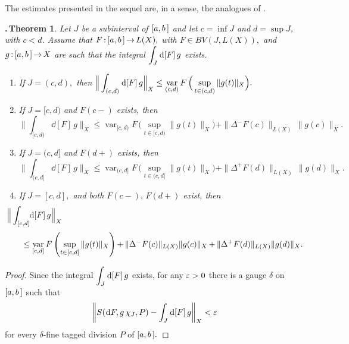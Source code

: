 \documentclass[12pt,twoside]{article}
\numberwithin{equation}{section}
\theoremstyle{plain}
\newtheorem{theorem}{\hskip-1mm.\,Theorem}[section]
\theoremstyle{definition}
\DeclareMathOperator{\var}{var}
\begin{document}
{\smallskip

The estimates presented in the sequel are, in a sense, the analogues of \cite[Proposition 10]{Sch1}.

\begin{theorem}\label{int-inequality}
Let $J$ be a subinterval of $[a,b\,]$ and let $c=\inf J$ and $d=\sup J$, with $c<d$.
Assume that $F\,{:}\,[a,b\,]\,{\to}\,L(X),$ with $F\in BV(J,L(X)),$ and
$g\,{:}\,[a,b\,]\,{\to}\,X$ are such that the integral $\displaystyle\int_{J}\hskip0.2mm\mbox{\rm d}[F]\,g$
exists.
\begin{enumerate}[{\rm (i)}]
\item If $J=(c,d),$ then
$\dis\Big\|\int_{(c,d)}\dd[F]\,g\Big\|_X\le\var_{(c,d)}F\,\Big(\sup_{t\in(c,d)}\|g(t)\|_X\Big).$

\item If $J=[c,d)$ and $F(c-)$ exists, then
\begin{equation*}\label{int[c,d)}
  \Big\|\int_{[c,d)}\dd[F]\,g\Big\|_X
  \le\var_{[c,d)}F\,\Big(\sup_{t\in[c,d)}\|g(t)\|_X\Big)
                                  +\|\Delta^-F(c)\|_{L(X)}\,\|g(c)\|_X.
\end{equation*}

\item If $J=(c,d]$ and $F(d+)$ exists, then
\begin{equation*}\label{int(c,d]}
  \Big\|\int_{(c,d]}\dd[F]\,g\Big\|_X
  \le\var_{(c,d]}F\,\Big(\sup_{t\in(c,d]}\|g(t)\|_X\Big)
                                      +\|\Delta^+F(d)\|_{L(X)}\,\|g(d)\|_X.
\end{equation*}

\item If $J=[c,d],$ and both $F(c-),\,F(d+)$ exist, then
\begin{align*}\label{int[c,d]}
  &\hskip-6mm\Big\|\int_{[c,d]}\hskip-1mm\dd[F]\,g\Big\|_X
\\[1mm]
  &\le\var_{[c,d]}F\left(\sup_{t\in[c,d]}\|g(t)\|_X\right)
	{+}\,\|\Delta^-F(c)\|_{L(X)}\|g(c)\|_X\,{+}\,\|\Delta^+F(d)\|_{L(X)}\|g(d)\|_X.
\end{align*}
\end{enumerate}
\end{theorem}
\begin{proof} Since the integral $\displaystyle\int_J\hskip0.2mm\mbox{\rm d}[F]\,g$ exists, for any
$\varepsilon>0$ there is a gauge $\delta$ on $[a,b\,]$ such that
\begin{equation}\label{intJ}
   \left\|S(\dd F,g\,\chi_J,P)-\int_J\dd[F]\,g\right\|_X<\eps
\end{equation}
for every $\delta$-fine tagged division $P$ of $[a,b\,].$


\end{proof}}
\end{document}
